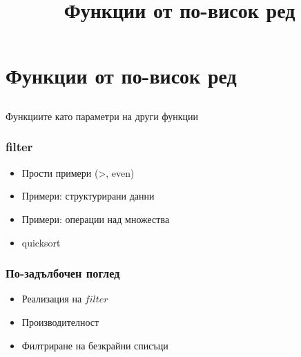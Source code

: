\documentclass{beamer}
\begin{document}
\title[Увод в курса]{Функции от по-висок ред}
\frame{\titlepage}

\section{Функции от по-висок ред}
\subsection{}

\begin{frame}
  \centerline{Функциите като параметри на други функции}
\end{frame}

\begin{frame}[fragile]
  \frametitle{filter}

  \begin{itemize}
    \item Прости примери (>, even)
    \item Примери: структурирани данни
    \item Примери: операции над множества
    \item quicksort
  \end{itemize}

\end{frame}

\begin{frame}[fragile]
  \frametitle{По-задълбочен поглед}

  \begin{itemize}
    \item Реализация на $filter$
    \item Производителност
    \item Филтриране на безкрайни списъци
  \end{itemize}

  
\end{frame}
\end{document}
